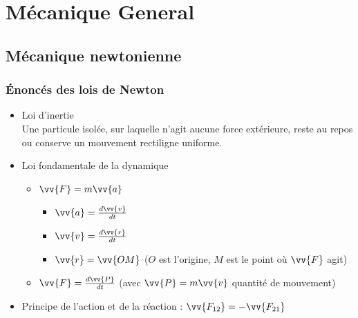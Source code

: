 \documentclass[12pt,oneside]{book}
\begin{document}


\part{Mécanique General}
\chapter{Mécanique newtonienne}
\section{Énoncés des lois de Newton}
\begin{itemize}
    \item Loi d'inertie \\
    Une particule isolée, sur laquelle n'agit aucune force extérieure, reste au repos ou conserve un mouvement rectiligne uniforme.
    \begin{center}
    \end{center}
    \item Loi fondamentale de la dynamique
    \begin{itemize}
        \item $\vv{F} = m\vv{a}$
        \begin{itemize}
            \item $\vv{a} = \frac{d\vv{v}}{dt}$
            \item $\vv{v} = \frac{d\vv{r}}{dt}$
            \item $\vv{r} = \vv{OM}$ ($O$ est l'origine, $M$ est le point où $\vv{F}$ agit)
        \end{itemize}
        \item $\vv{F} = \frac{d\vv{P}}{dt}$ (avec $\vv{P} = m\vv{v}$ quantité de mouvement)
    \end{itemize}
    \item Principe de l'action et de la réaction : $\vv{F_{12}} = -\vv{F_{21}}$
\end{itemize}
\pagebreak
\end{document}
